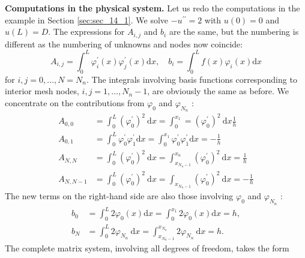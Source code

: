 \documentclass[../main.tex]{subfiles}
\begin{document}
		\noindent \textbf{Computations in the physical system.   } Let us redo the computations in the example in Section \ref{sec:sec_14_1}. We solve $-u^{\prime \prime}=2$ with $u(0)=0$ and $u(L)=D$. The expressions for $A_{i, j}$ and $b_{i}$ are the same, but the numbering is different as the numbering of unknowns and nodes now coincide:
		$$
		A_{i, j}=\int_{0}^{L} \varphi_{i}^{\prime}(x) \varphi_{j}^{\prime}(x) \mathrm{d} x, \quad b_{i}=\int_{0}^{L} f(x) \varphi_{i}(x) \mathrm{d} x
		$$
		for $i, j=0, \ldots, N=N_{n}$. The integrals involving basis functions corresponding to interior mesh nodes, $i, j=1, \ldots, N_{n}-1$, are obviously the same as before. We concentrate on the contributions from $\varphi_{0}$ and $\varphi_{N_{n}}$ :
		$$
		\begin{aligned}
			A_{0,0} &=\int_{0}^{L}\left(\varphi_{0}^{\prime}\right)^{2} \mathrm{~d} x=\int_{0}^{x_{1}}=\left(\varphi_{0}^{\prime}\right)^{2} \mathrm{~d} x \frac{1}{h} \\
			A_{0,1} &=\int_{0}^{L} \varphi_{0}^{\prime} \varphi_{1}^{\prime} \mathrm{d} x=\int_{0}^{x_{1}} \varphi_{0}^{\prime} \varphi_{1}^{\prime} \mathrm{d} x=-\frac{1}{h} \\
			A_{N, N} &=\int_{0}^{L}\left(\varphi_{0}^{\prime}\right)^{2} \mathrm{~d} x=\int_{x_{N_{n}-1}}^{x_{n}}\left(\varphi_{0}^{\prime}\right)^{2} \mathrm{~d} x=\frac{1}{h} \\
			A_{N, N-1} &=\int_{0}^{L}\left(\varphi_{0}^{\prime}\right)^{2} \mathrm{~d} x=\int_{x_{N_{n}-1}}\left(\varphi_{0}^{\prime}\right)^{2} \mathrm{~d} x=-\frac{1}{h}
		\end{aligned}
		$$
		The new terms on the right-hand side are also those involving $\varphi_{0}$ and $\varphi_{N_{n}}$ :
		$$
		\begin{aligned}
			b_{0} &=\int_{0}^{L} 2 \varphi_{0}(x) \mathrm{d} x=\int_{0}^{x_{1}} 2 \varphi_{0}(x) \mathrm{d} x=h, \\
			b_{N} &=\int_{0}^{L} 2 \varphi_{N_{n}} \mathrm{~d} x=\int_{x_{N_{n}-1}}^{x_{N_{n}}} 2 \varphi_{N_{n}} \mathrm{~d} x=h .
		\end{aligned}
		$$
		The complete matrix system, involving all degrees of freedom, takes the form
\end{document}
